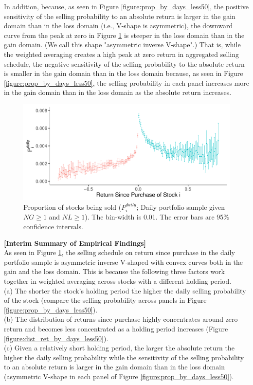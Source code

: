 \documentclass[11pt, a4paper]{article}
\begin{document}
In addition, because, as seen  in Figure \ref{figure:prop_by_days_less50}, the positive sensitivity of the selling probability to an absolute return is larger in the gain domain than in the loss domain (i.e.,  V-shape is asymmetric), the downward curve from the peak at zero in Figure \ref{figure:prop_NG1NL1} is steeper in the loss domain than in the gain domain. (We call this shape "asymmetric inverse V-shape".) That is, while the weighted averaging creates a high peak at zero return in aggregated selling schedule, the negative sensitivity of the selling probability to the absolute return is smaller in the gain domain than in the loss domain because, as seen  in Figure \ref{figure:prop_by_days_less50}, the selling probability in each panel increases more in the gain domain than in the loss domain as the absolute return increases.

\begin{figure}[H]
	\centering
	\includegraphics[width=0.8\columnwidth]{barc_schedule_daily_NG1_NL1_3.pdf}
	\caption{Proportion of stocks being sold ($P^{daily}_{i}$; Daily portfolio sample given $NG\geq1$ and $NL\geq1$). The bin-width is 0.01. The error bars are 95\% confidence intervals.}
	\label{figure:prop_NG1NL1}
\end{figure}

\noindent
\textbf{[Interim Summary of Empirical Findings]}\\
As seen in Figure \ref{figure:prop_NG1NL1}, the selling schedule on return since purchase in the daily portfolio sample is asymmetric inverse V-shaped with convex curves both in the gain and the loss domain. This is because the following three factors work together in weighted averaging across stocks with a different holding period.\\

\noindent
(a) The shorter the stock's holding period the higher the daily selling probability of the stock (compare the selling probability across panels in Figure \ref{figure:prop_by_days_less50}).\\
\noindent
(b) The distribution of returns since purchase highly concentrates around zero return and becomes less concentrated as a holding period increases (Figure \ref{figure:dist_ret_by_days_less50}).\\
\noindent
(c) Given a relatively short holding period, the larger the absolute return the higher the daily selling probability while the sensitivity of the selling probability to an absolute return is larger in the gain domain than in the loss domain (asymmetric V-shape in each panel of Figure \ref{figure:prop_by_days_less50}).\\
\end{document}
